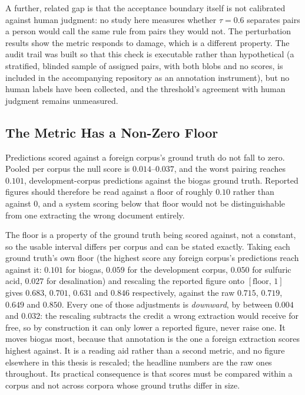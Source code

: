 \documentclass[11pt]{article}
\begin{document}
A further, related gap is that the acceptance boundary itself is not calibrated
against human judgment: no study here measures whether $\tau = 0.6$ separates
pairs a person would call the same rule from pairs they would not. The
perturbation results show the metric responds to damage, which is a different
property. The audit trail was built so that this check is executable rather
than hypothetical (a stratified, blinded sample of assigned pairs, with both
blobs and no scores, is included in the accompanying repository as an
annotation instrument), but no human labels have been collected, and the
threshold's agreement with human judgment remains unmeasured.

\subsection{The Metric Has a Non-Zero Floor}
\label{sec:lim_floor}
Predictions scored against a foreign corpus's ground truth do not fall to zero.
Pooled per corpus the null score is $0.014$--$0.037$, and the worst pairing
reaches $0.101$, development-corpus predictions against the biogas ground
truth. Reported figures should therefore be read against a floor of roughly
$0.10$ rather than against $0$, and a system scoring
below that floor would not be distinguishable from one extracting the wrong
document entirely.

The floor is a property of the ground truth being scored against, not a constant,
so the usable interval differs per corpus and can be stated exactly. Taking each
ground truth's own floor (the highest score any foreign corpus's predictions
reach against it: $0.101$ for biogas, $0.059$ for the development corpus,
$0.050$ for sulfuric acid, $0.027$ for desalination) and rescaling the reported
figure onto $[\text{floor},\,1]$ gives $0.683$, $0.701$, $0.631$ and $0.846$
respectively, against the raw $0.715$, $0.719$, $0.649$ and $0.850$. Every one of
those adjustments is \emph{downward}, by between $0.004$ and $0.032$: the rescaling
subtracts the credit a wrong extraction would receive for free, so by construction
it can only lower a reported figure, never raise one. It moves biogas most,
because that annotation is the one a foreign extraction scores highest against. It is a reading aid rather
than a second metric, and no figure elsewhere in this thesis is rescaled; the
headline numbers are the raw ones throughout. Its practical consequence is that
scores must be compared within a corpus and not across corpora whose ground
truths differ in size.
\end{document}
